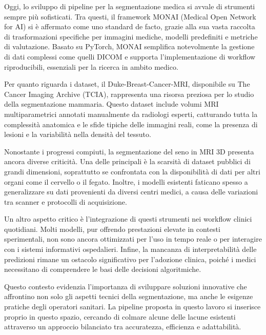 Oggi, lo sviluppo di pipeline per la segmentazione medica si avvale di strumenti sempre più sofisticati. Tra questi, il framework MONAI (Medical Open Network for AI) si è affermato come uno standard de facto, grazie alla sua vasta raccolta di trasformazioni specifiche per immagini mediche, modelli predefiniti e metriche di valutazione. Basato su PyTorch, MONAI semplifica notevolmente la gestione di dati complessi come quelli DICOM e supporta l’implementazione di workflow riproducibili, essenziali per la ricerca in ambito medico.

Per quanto riguarda i dataset, il Duke-Breast-Cancer-MRI, disponibile su The Cancer Imaging Archive (TCIA), rappresenta una risorsa preziosa per lo studio della segmentazione mammaria. Questo dataset include volumi MRI multiparametrici annotati manualmente da radiologi esperti, catturando tutta la complessità anatomica e le sfide tipiche delle immagini reali, come la presenza di lesioni e la variabilità nella densità del tessuto.

Nonostante i progressi compiuti, la segmentazione del seno in MRI 3D presenta ancora diverse criticità. Una delle principali è la scarsità di dataset pubblici di grandi dimensioni, soprattutto se confrontata con la disponibilità di dati per altri organi come il cervello o il fegato. Inoltre, i modelli esistenti faticano spesso a generalizzare su dati provenienti da diversi centri medici, a causa delle variazioni tra scanner e protocolli di acquisizione.

Un altro aspetto critico è l’integrazione di questi strumenti nei workflow clinici quotidiani. Molti modelli, pur offrendo prestazioni elevate in contesti sperimentali, non sono ancora ottimizzati per l’uso in tempo reale o per interagire con i sistemi informativi ospedalieri. Infine, la mancanza di interpretabilità delle predizioni rimane un ostacolo significativo per l’adozione clinica, poiché i medici necessitano di comprendere le basi delle decisioni algoritmiche.

Questo contesto evidenzia l’importanza di sviluppare soluzioni innovative che affrontino non solo gli aspetti tecnici della segmentazione, ma anche le esigenze pratiche degli operatori sanitari. La pipeline proposta in questo lavoro si inserisce proprio in questo spazio, cercando di colmare alcune delle lacune esistenti attraverso un approccio bilanciato tra accuratezza, efficienza e adattabilità.